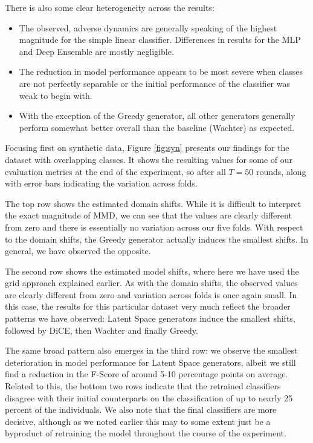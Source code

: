 \documentclass[conference,final,]{IEEEtran}
\providecommand{\tightlist}{%
  \setlength{\itemsep}{0pt}\setlength{\parskip}{0pt}}
\theoremstyle{definition}
\theoremstyle{definition}
\theoremstyle{definition}
\theoremstyle{definition}
\theoremstyle{remark}
\begin{document}
There is also some clear heterogeneity across the results:

\begin{itemize}
\tightlist
\item
  The observed, adverse dynamics are generally speaking of the highest magnitude for the simple linear classifier. Differences in results for the MLP and Deep Ensemble are mostly negligible.
\item
  The reduction in model performance appears to be most severe when classes are not perfectly separable or the initial performance of the classifier was weak to begin with.
\item
  With the exception of the Greedy generator, all other generators generally perform somewhat better overall than the baseline (Wachter) as expected.
\end{itemize}

Focusing first on synthetic data, Figure \ref{fig:syn} presents our findings for the dataset with overlapping classes. It shows the resulting values for some of our evaluation metrics at the end of the experiment, so after all \(T=50\) rounds, along with error bars indicating the variation across folds.

The top row shows the estimated domain shifts. While it is difficult to interpret the exact magnitude of MMD, we can see that the values are clearly different from zero and there is essentially no variation across our five folds. With respect to the domain shifts, the Greedy generator actually induces the smallest shifts. In general, we have observed the opposite.

The second row shows the estimated model shifts, where here we have used the grid approach explained earlier. As with the domain shifts, the observed values are clearly different from zero and variation across folds is once again small. In this case, the results for this particular dataset very much reflect the broader patterns we have observed: Latent Space generators induce the smallest shifts, followed by DiCE, then Wachter and finally Greedy.

The same broad pattern also emerges in the third row: we observe the smallest deterioration in model performance for Latent Space generators, albeit we still find a reduction in the F-Score of around 5-10 percentage points on average. Related to this, the bottom two rows indicate that the retrained classifiers disagree with their initial counterparts on the classification of up to nearly 25 percent of the individuals. We also note that the final classifiers are more decisive, although as we noted earlier this may to some extent just be a byproduct of retraining the model throughout the course of the experiment.
\end{document}
